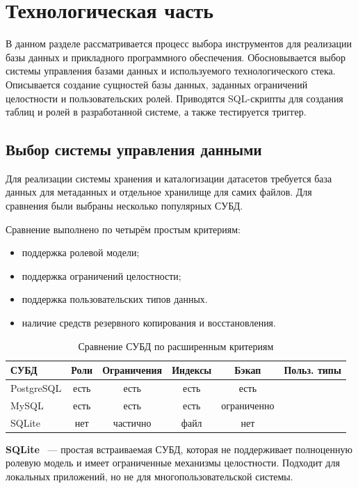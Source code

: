 \chapter{Технологическая часть}

В данном разделе рассматривается процесс выбора инструментов для
реализации базы данных и прикладного программного обеспечения.
Обосновывается выбор системы управления базами данных и используемого
технологического стека. Описывается создание сущностей базы данных,
заданных ограничений целостности и пользовательских ролей.
Приводятся SQL-скрипты для создания таблиц и ролей в разработанной
системе, а также тестируется триггер.

\section{Выбор системы управления данными}

Для реализации системы хранения и каталогизации датасетов требуется база данных для
метаданных и отдельное хранилище для самих файлов. Для сравнения были выбраны
несколько популярных СУБД.

Сравнение выполнено по четырём простым критериям:
\begin{itemize}
  \item поддержка ролевой модели;
  \item поддержка ограничений целостности;
  \item поддержка пользовательских типов данных.
  \item наличие средств резервного копирования и восстановления.
\end{itemize}

\begin{table}[H]
\centering
\caption{Сравнение СУБД по расширенным критериям}
\label{tab:db_comparison_extended}
\renewcommand{\arraystretch}{1.2}
\begin{tabular}{|p{3cm}|c|c|c|c|c|}
\hline
\textbf{СУБД} & \textbf{Роли} & \textbf{Ограничения} & \textbf{Индексы} & \textbf{Бэкап} & \textbf{Польз. типы} \\
\hline
PostgreSQL & есть & есть & есть & есть \\
\hline
MySQL & есть & есть & есть & ограниченно \\
\hline
SQLite & нет & частично & файл & нет \\
\hline
\end{tabular}
\end{table}

\textbf{SQLite}~\cite{sqllite} --- простая встраиваемая СУБД, которая не поддерживает полноценную ролевую модель и
имеет ограниченные механизмы целостности.
Подходит для локальных приложений, но не для многопользовательской системы.

